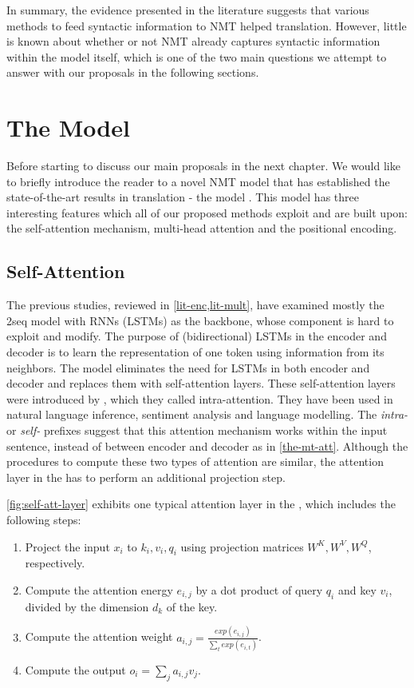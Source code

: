 In summary, the evidence presented in the literature suggests that various methods to feed syntactic information to NMT helped translation. However, little is known about whether or not NMT already captures syntactic information within the model itself, which is one of the two main questions we attempt to answer with our proposals in the following sections.

\section{The \transformer Model}
\label{lit-trans}

Before starting to discuss our main proposals in the next chapter. We would like to briefly introduce the reader to a novel NMT model that has established the state-of-the-art results in translation - the \transformer model \citep{DBLP:conf/nips/VaswaniSPUJGKP17}.
This model has three interesting features which all of our proposed methods exploit and are built upon: the self-attention mechanism, multi-head attention and the positional encoding.

\subsection{Self-Attention}
\label{lit-trans-att}

The previous studies, reviewed in \cref{lit-enc,lit-mult}, have examined mostly the \seq2seq model with RNNs (LSTMs) as the backbone, whose component is hard to exploit and modify.
The purpose of (bidirectional) LSTMs in the encoder and decoder is to learn the representation of one token using information from its neighbors.
The \transformer model eliminates the need for LSTMs in both encoder and decoder and replaces them with self-attention layers.
These self-attention layers were introduced by \cite{cheng-dong-lapata:2016:EMNLP2016}, which they called intra-attention.
They have been used in natural language inference, sentiment analysis and language modelling.
The \textit{intra-} or \textit{self-} prefixes suggest that this attention mechanism works within the input sentence, instead of between encoder and decoder as in \cref{the-mt-att}. Although the procedures to compute these two types of attention are similar, the attention layer in the \transformer has to perform an additional projection step. 

\cref{fig:self-att-layer} exhibits one typical attention layer in the \transformer, which includes the following steps:
\begin{enumerate}
    \item Project the input $x_i$ to $k_i, v_i, q_i$ using projection matrices $W^K, W^V, W^Q$, respectively.
    \item Compute the attention energy $e_{i,j}$ by a dot product of query $q_i$ and key $v_i$, divided by the dimension $d_k$ of the key.
    \item Compute the attention weight $a_{i,j}=\frac{exp(e_{i,j})}{\sum_{t}exp(e_{i,t})}$.
    \item Compute the output $o_i = \sum_{j} a_{i,j}v_j$.
\end{enumerate}

